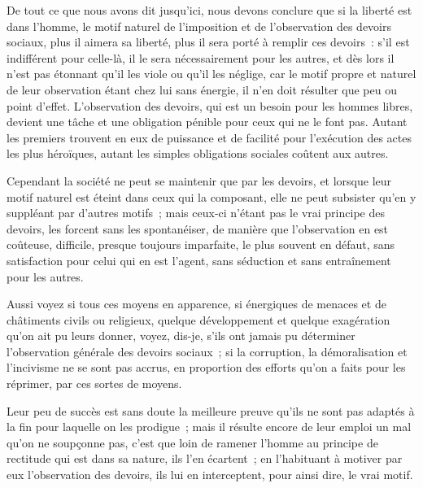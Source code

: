 \documentclass[french,twoside]{book} %
\newcommand\chaptercont{} %
\begin{document}
\chaptercont
\noindent De tout ce que nous avons dit jusqu’ici, nous devons conclure que si la liberté est dans l’homme, le motif naturel de l’imposition et de l’observation des devoirs sociaux, plus il aimera sa liberté, plus il sera porté à remplir ces devoirs : s’il est indifférent pour celle-là, il le sera nécessairement pour les autres, et dès lors il n’est pas étonnant qu’il les viole ou qu’il les néglige, car le motif propre et naturel de leur observation étant chez lui sans énergie, il n’en doit résulter que peu ou point d’effet. L’observation des devoirs, qui est un besoin pour les hommes libres, devient une tâche et une obligation pénible pour ceux qui ne le font pas. Autant les premiers trouvent en eux de puissance et de facilité pour l’exécution des actes les plus héroïques, autant les simples obligations sociales coûtent aux autres.\par
Cependant la société ne peut se maintenir que par les devoirs, et lorsque leur motif naturel est éteint dans ceux qui la composant, elle ne peut subsister qu’en y suppléant par d’autres motifs ; mais ceux-ci n’étant pas le vrai principe des devoirs, les forcent sans les spontanéiser, de manière que l’observation en est coûteuse, difficile, presque toujours imparfaite, le plus souvent en défaut, sans satisfaction pour celui qui en est l’agent, sans séduction et sans entraînement pour les autres.\par
Aussi voyez si tous ces moyens en apparence, si énergiques de menaces et de châtiments civils ou religieux, quelque développement et quelque exagération qu’on ait pu leurs donner, voyez, dis-je, s’ils ont jamais pu déterminer l’observation générale des devoirs sociaux ; si la corruption, la démoralisation et l’incivisme ne se sont pas accrus, en proportion des efforts qu’on a faits pour les réprimer, par ces sortes de moyens.\par
Leur peu de succès est sans doute la meilleure preuve qu’ils ne sont pas adaptés à la fin pour laquelle on les prodigue ; mais il résulte encore de leur emploi un mal qu’on ne soupçonne pas, c’est que loin de ramener l’homme au principe de rectitude qui est dans sa nature, ils l’en écartent ; en l’habituant à motiver par eux l’observation des devoirs, ils lui en interceptent, pour ainsi dire, le vrai motif.\par
\end{document}
